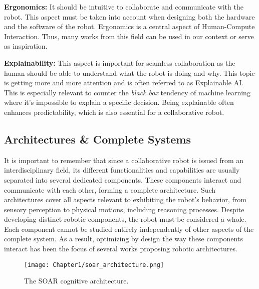 \textbf{Ergonomics:} It should be intuitive to collaborate and communicate with the robot. This aspect must be taken into account when designing both the hardware and the software of the robot. Ergonomics is a central aspect of Human-Compute Interaction. Thus, many works from this field can be used in our context or serve as inspiration.

\textbf{Explainability:} This aspect is important for seamless collaboration as the human should be able to understand what the robot is doing and why. This topic is getting more and more attention and is often referred to as Explainable AI. This is especially relevant to counter the \textit{black box} tendency of machine learning where it's impossible to explain a specific decision. Being explainable often enhances predictability, which is also essential for a collaborative robot.

\subsection{Architectures \& Complete Systems}

It is important to remember that since a collaborative robot is issued from an interdisciplinary field, its different functionalities and capabilities are usually separated into several dedicated components. These components interact and communicate with each other, forming a complete architecture. Such architectures cover all aspects relevant to exhibiting the robot's behavior, from sensory perception to physical motions, including reasoning processes. 
Despite developing distinct robotic components, the robot must be considered a whole. Each component cannot be studied entirely independently of other aspects of the complete system. As a result, optimizing by design the way these components interact has been the focus of several works proposing robotic architectures.

\begin{figure}
    \center
    \texttt{[image: Chapter1/soar\_architecture.png]}
    \caption{The SOAR cognitive architecture.}
    \label{fig:soar}
\end{figure}

